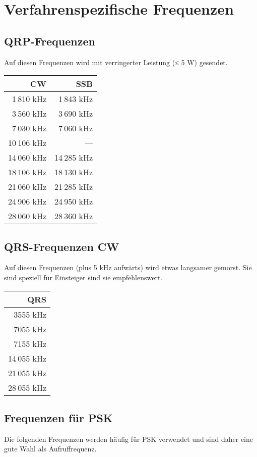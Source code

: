 \section{Verfahrenspezifische Frequenzen}
\subsection{QRP-Frequenzen}
Auf diesen Frequenzen wird mit verringerter Leistung (≤ 5 W) gesendet.

\vspace{1em}
\noindent
\begin{tabular}{r r}
\bfseries CW & \bfseries SSB \\ \toprule \arrayrulecolor{rowsep}
 1 810 kHz &  1 843 kHz \\ \midrule
 3 560 kHz &  3 690 kHz \\ \midrule
 7 030 kHz &  7 060 kHz \\ \midrule
10 106 kHz &          — \\ \midrule
14 060 kHz & 14 285 kHz \\ \midrule
18 106 kHz & 18 130 kHz \\ \midrule
21 060 kHz & 21 285 kHz \\ \midrule
24 906 kHz & 24 950 kHz \\ \midrule
28 060 kHz & 28 360 kHz \\ \midrule
\end{tabular}

\subsection{QRS-Frequenzen CW}
Auf diesen Frequenzen (plus 5 kHz aufwärts) wird etwas langsamer gemorst. Sie sind speziell für Einsteiger sind sie empfehlenswert.

\nopagebreak[5]
\vspace{1em}
\noindent
\begin{tabular}{r}
  \textbf{QRS} \\ \toprule \arrayrulecolor{rowsep}
  3555 kHz \\ \midrule
  7055 kHz \\ \midrule
  7155 kHz \\ \midrule
14 055 kHz \\ \midrule
21 055 kHz \\ \midrule
28 055 kHz \\ \midrule
\end{tabular}

\subsection{Frequenzen für PSK}
Die folgenden Frequenzen werden häufig für PSK verwendet und sind daher eine gute Wahl als Aufruffrequenz.

